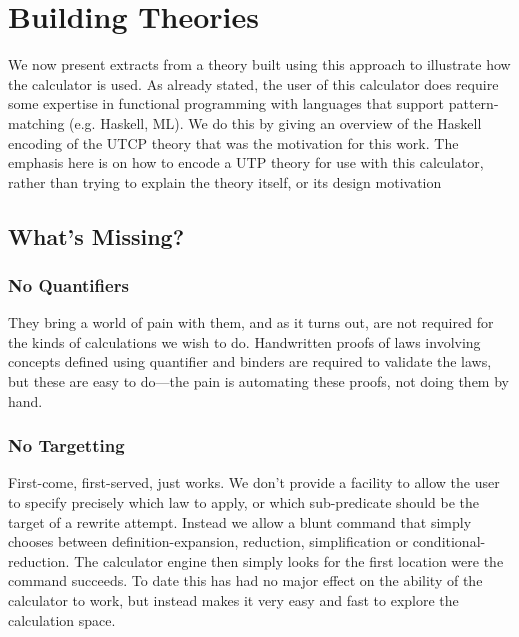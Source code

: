 \section{Building Theories}\label{sec:Theorising}


We now present extracts from a theory built using this
approach to illustrate how the calculator is used.
As already stated,
the user of this calculator does require some expertise
in functional programming with languages that support
pattern-matching (e.g. Haskell, ML).
We do this by giving an overview of the Haskell encoding
of the UTCP theory
that was the motivation for this work.
The emphasis here is on how to encode a UTP theory for use with this
calculator,
rather than trying to explain the theory itself, or its design motivation



\subsection{What's Missing?}

\subsubsection{No Quantifiers}\label{ssec:no-quant}

    They bring a world of pain with them,
    and as it turns out, are not required
    for the kinds of calculations we wish to do.
    Handwritten proofs of laws involving concepts
    defined using quantifier and binders
    are required to validate the laws,
    but these are easy to do---the pain is automating these proofs,
    not doing them by hand.

\subsubsection{No Targetting}\label{ssec:no-target}

First-come, first-served, just works.
We don't provide a facility
to allow the user to specify
precisely which law to apply,
or which sub-predicate should be the target of a rewrite attempt.
Instead we allow a blunt command that simply chooses between
definition-expansion, reduction, simplification or conditional-reduction.
The calculator engine then simply looks for the first location 
were the command succeeds.
To date this has had no major effect on the ability of the calculator
to work, but instead makes it very easy and fast to explore the calculation space.


